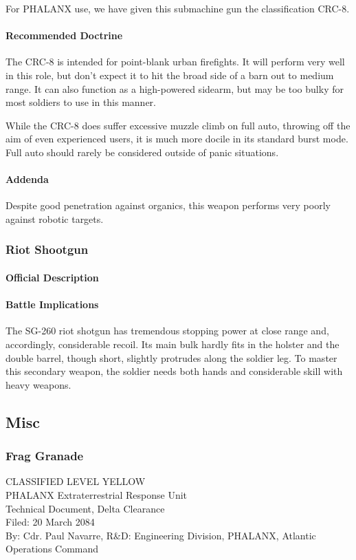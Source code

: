 For PHALANX use, we have given this submachine gun the classification CRC-8.
\paragraph*{Recommended Doctrine}
The CRC-8 is intended for point-blank urban firefights. It will perform very well in this role, but don't expect it to hit the broad side of a barn out to medium range. It can also function as a high-powered sidearm, but may be too bulky for most soldiers to use in this manner.

While the CRC-8 does suffer excessive muzzle climb on full auto, throwing off the aim of even experienced users, it is much more docile in its standard burst mode. Full auto should rarely be considered outside of panic situations.
\paragraph*{Addenda}
Despite good penetration against organics, this weapon performs very poorly against robotic targets. 
\subsubsection*{Riot Shootgun}
\paragraph*{Official Description}
\paragraph*{Battle Implications}
The SG-260 riot shotgun has tremendous stopping power at close range and, accordingly, considerable recoil. Its main bulk hardly fits in the holster and the double barrel, though short, slightly protrudes along the soldier leg. To master this secondary weapon, the soldier needs both hands and considerable skill with heavy weapons. 
\subsection{Misc}
\subsubsection*{Frag Granade}
CLASSIFIED LEVEL YELLOW\\
PHALANX Extraterrestrial Response Unit\\
Technical Document, Delta Clearance\\
Filed: 20 March 2084\\
By: Cdr. Paul Navarre, R&D: Engineering Division, PHALANX, Atlantic Operations Command\\
